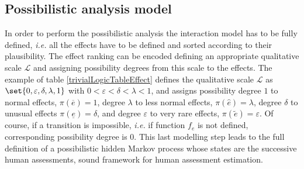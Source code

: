\subsection{Possibilistic analysis model}
\label{subsec:possibilisticModel}
In order to perform the possibilistic analysis the interaction model has to be fully defined, \textit{i.e.} all the effects have to be defined and sorted according to their plausibility. The effect ranking can be encoded defining an appropriate qualitative 
scale $\mathcal{L}$ and assigning possibility degrees from
this scale to the effects. 
The example of table \ref{trivialLogicTableEffect}
defines the qualitative scale $\mathcal{L}$ as 
$\set{ 0, \varepsilon, \delta, \lambda, 1 }$
with $0 < \varepsilon < \delta < \lambda < 1 $, 
and assigns possibility degree $1$ to normal effects, 
$\pi(\overline{e})=1$, 
degree $\lambda$ to less normal effects, 
$\pi(\widehat{e}) = \lambda$, 
degree $\delta$ to unusual effects 
$\pi(\underline{e})=\delta$, 
and degree $\varepsilon$ to very rare effects, 
$\pi(\tilde{e})=\varepsilon$.
Of course, if a transition is impossible, \textit{i.e.} if function $f_e$ is not defined,
corresponding possibility degree is $0$. 
This last modelling step leads to the full definition 
of a possibilistic hidden Markov process whose states
are the successive human assessments, sound framework for human assessment estimation.

